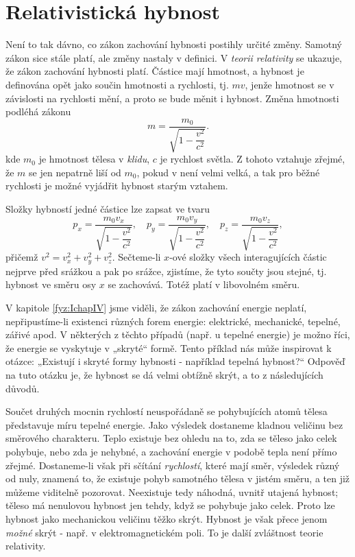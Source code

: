   \section{Relativistická hybnost}
    Není to tak dávno, co zákon zachování hybnosti postihly určité změny. Samotný zákon sice stále 
    platí, ale změny nastaly v definici. V \emph{teorii relativity} se ukazuje, že zákon zachování 
    hybnosti platí. Částice mají hmotnost, a hybnost je definována opět jako součin hmotnosti a 
    rychlosti, tj. \(mv\), jenže hmotnost se v závislosti na rychlosti mění, a proto se bude měnit 
    i hybnost. Změna hmotnosti podléhá zákonu
    \begin{equation}\label{fyz:eq143}
      m = \dfrac{m_0}{\sqrt{1 - \dfrac{v^2}{c^2}}}.
    \end{equation}
    kde \(m_0\) je hmotnost tělesa v \emph{klidu}, \(c\) je rychlost světla. Z tohoto vztahuje 
    zřejmé, že \(m\) se jen nepatrně liší od \(m_0\), pokud v není velmi velká, a tak pro běžné 
    rychlosti je možné vyjádřit hybnost starým vztahem.
    
    Složky hybností jedné částice lze zapsat ve tvaru
    \begin{equation}\label{fyz:eq144}
      p_x = \dfrac{m_0v_x}{\sqrt{1 - \dfrac{v^2}{c^2}}}, \quad
      p_y = \dfrac{m_0v_y}{\sqrt{1 - \dfrac{v^2}{c^2}}}, \quad
      p_z = \dfrac{m_0v_z}{\sqrt{1 - \dfrac{v^2}{c^2}}},
    \end{equation}
    přičemž \(v^2 = v_x^2 + v_y^2 + v_z^2\). Sečteme-li \(x\)-ové složky všech interagujících 
    částic nejprve před srážkou a pak po srážce, zjistíme, že tyto součty jsou stejné, tj. hybnost 
    ve směru osy \(x\) se zachovává. Totéž platí v libovolném směru.
    
    V kapitole \ref{fyz:IchapIV} jsme viděli, že zákon zachování energie neplatí, nepřipustíme-li 
    existenci různých forem energie: elektrické, mechanické, tepelné, zářivé apod. V některých z 
    těchto případů (např. u tepelné energie) je možno říci, že energie se vyskytuje v „skryté“ 
    formě. Tento příklad nás může inspirovat k otázce: „Existují i skryté formy hybnosti - 
    například tepelná hybnost?“  Odpověď na tuto otázku je, že hybnost se dá velmi obtížně skrýt, a 
    to z následujících důvodů.
    
    Součet druhých mocnin rychlostí neuspořádaně se pohybujících atomů tělesa představuje míru 
    tepelné energie. Jako výsledek dostaneme kladnou veličinu bez směrového charakteru. Teplo 
    existuje bez ohledu na to, zda se těleso jako celek pohybuje, nebo zda je nehybné, a zachování 
    energie v podobě tepla není přímo zřejmé. Dostaneme-li však při sčítání \emph{rychlostí}, které 
    mají směr, výsledek různý od nuly, znamená to, že existuje pohyb samotného tělesa v jistém 
    směru, a ten již můžeme viditelně pozorovat. Neexistuje tedy náhodná, uvnitř utajená hybnost; 
    těleso má nenulovou hybnost jen tehdy, když se pohybuje jako celek. Proto lze hybnost jako 
    mechanickou veličinu těžko skrýt. Hybnost je však přece jenom \emph{možné} skrýt - např. v 
    elektromagnetickém poli. To je další zvláštnost teorie relativity.
    
